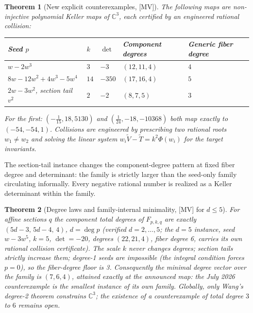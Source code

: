 \documentclass[11pt]{article}
\newtheorem{theorem}{Theorem}[section]
\theoremstyle{definition}
\theoremstyle{remark}
\newcommand{\C}{\mathbb{C}}
\begin{document}
\begin{theorem}[New explicit counterexamples, {[MV]}]\label{thm:instances}
The following maps are non-injective polynomial Keller maps of $\C^3$, each certified by an
engineered rational collision:
\begin{center}
\begin{tabular}{lllll}
\toprule
Seed $p$ & $k$ & $\det$ & Component degrees & Generic fiber degree \\
\midrule
$w - 2w^3$ & $3$ & $-3$ & $(12, 11, 4)$ & $4$ \\
$8w - 12w^2 + 4w^3 - 5w^4$ & $14$ & $-350$ & $(17, 16, 4)$ & $5$ \\
$2w - 3w^2$, section tail $v^2$ & $2$ & $-2$ & $(8, 7, 5)$ & $3$ \\
\bottomrule
\end{tabular}
\end{center}
For the first: $(-\tfrac{1}{15}, 18, 5130)$ and $(\tfrac{1}{24}, -18, -10368)$ both map exactly
to $(-54, -54, 1)$. Collisions are engineered by prescribing two rational roots $w_1 \ne w_2$ and
solving the linear system $w_i \tilde V - \tilde T = k^2 \Phi(w_i)$ for the target invariants.
\end{theorem}

The section-tail instance changes the component-degree pattern at fixed fiber degree and
determinant: the family is strictly larger than the seed-only family circulating informally.
Every negative rational number is realized as a Keller determinant within the family.

\begin{theorem}[Degree laws and family-internal minimality, {[MV]} for $d \le 5$]\label{thm:degrees}
For affine sections $q$ the component total degrees of $F_{p,k,q}$ are exactly
$(5d - 3,\, 5d - 4,\, 4)$, $d = \deg p$ (verified $d = 2, \dots, 5$; the $d = 5$ instance, seed
$w - 3w^5$, $k = 5$, $\det = -20$, degrees $(22, 21, 4)$, fiber degree 6, carries its own
rational collision certificate). The scale $k$ never changes degrees; section tails strictly
increase them; degree-1 seeds are impossible (the integral condition forces $p = 0$), so the
fiber-degree floor is 3. Consequently the minimal degree vector over the family is $(7, 6, 4)$,
attained exactly at the announced map: \emph{the July 2026 counterexample is the smallest
instance of its own family}. Globally, only Wang's degree-2 theorem constrains $\C^3$; the
existence of a counterexample of total degree $3$ to $6$ remains open.
\end{theorem}
\end{document}
